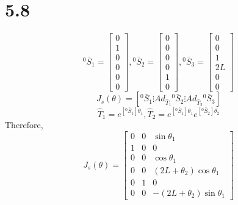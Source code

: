 \documentclass[onecolumn,oneside]{SUSTechHomework}
\begin{document}
  \section*{5.8}
  \[
  {}^0\bar{S}_1 = \begin{bmatrix}
    0 \\ 1 \\ 0 \\ 0 \\ 0 \\ 0 
  \end{bmatrix},
  {}^0\bar{S}_2 = \begin{bmatrix}
    0 \\ 0 \\ 0 \\ 0 \\ 1 \\ 0
  \end{bmatrix},
  {}^0\bar{S}_3 = \begin{bmatrix}
    0 \\ 0 \\ 1 \\ 2L \\ 0 \\ 0 
  \end{bmatrix}
  \]
  \[
    J_s(\theta) = [{}^0\bar{S}_1 \vdots Ad_{\hat{T}_1}{}^0\bar{S}_2 \vdots Ad_{\hat{T}_2}{}^0\bar{S}_3]
  \]
  \[
    \hat{T}_1 = e^{[{}^0\bar{S}_1]\theta_1}, \hat{T}_2 = e^{[{}^0\bar{S}_1]\theta_1}e^{[{}^0\bar{S}_2]\theta_2}
  \]
  Therefore,
  \[
    J_s(\theta) = \begin{bmatrix}
      0 & 0 & \sin \theta_1 \\
      1 & 0 & 0 \\
      0 & 0 & \cos \theta_1 \\
      0 & 0 & (2L + \theta_2) \cos \theta_1 \\
      0 & 1 & 0 \\
      0 & 0 & -(2L + \theta_2) \sin \theta_1
      \end{bmatrix}
  \]
\end{document}
